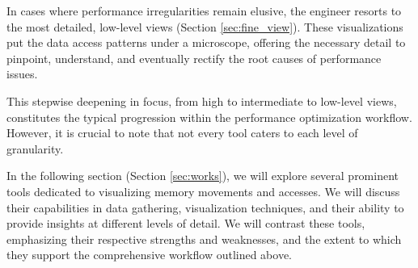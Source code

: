 In cases where performance irregularities remain elusive, the engineer resorts to the most detailed, low-level views (Section \ref{sec:fine_view}). These visualizations put the data access patterns under a microscope, offering the necessary detail to pinpoint, understand, and eventually rectify the root causes of performance issues.

This stepwise deepening in focus, from high to intermediate to low-level views, constitutes the typical progression within the performance optimization workflow. However, it is crucial to note that not every tool caters to each level of granularity.

In the following section (Section \ref{sec:works}), we will explore several prominent tools dedicated to visualizing memory movements and accesses. We will discuss their capabilities in data gathering, visualization techniques, and their ability to provide insights at different levels of detail. We will contrast these tools, emphasizing their respective strengths and weaknesses, and the extent to which they support the comprehensive workflow outlined above.